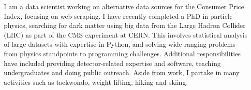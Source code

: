 
\begin{cvparagraph}
I am a data scientist working on alternative data sources for the Consumer Price Index, focusing on web scraping. I have recently completed a PhD in particle physics, searching for dark matter using big data from the Large Hadron Collider (LHC) as part of the CMS experiment at CERN. This involves statistical analysis of large datasets with expertise in Python, and solving wide ranging problems from physics standpoints to programming challenges. Additional responsibilities have included providing detector-related expertise and software, teaching undergraduates and doing public outreach. Aside from work, I partake in many activities such as taekwondo, weight lifting, hiking and skiing.
\end{cvparagraph}
